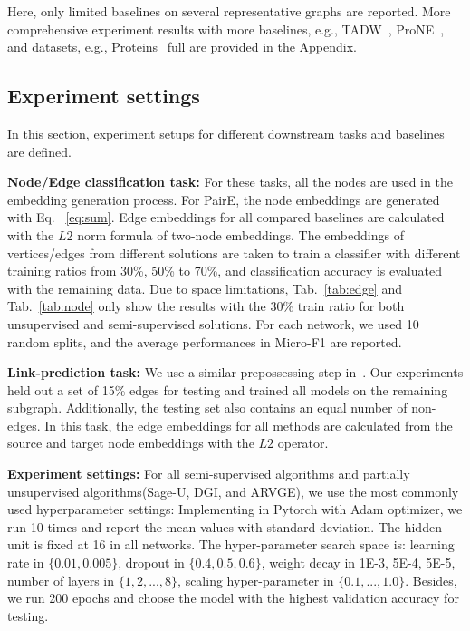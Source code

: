 \documentclass[10pt,journal,compsoc]{IEEEtran}
\begin{document}
Here, only limited baselines on several representative graphs are reported. More comprehensive experiment results with more baselines, e.g., TADW~\cite{yang2015TADM}, ProNE~\cite{Zhang19_prone}, and datasets, e.g., Proteins\_full are provided in the Appendix. 
 
\subsection{Experiment settings}

In this section, experiment setups for different downstream tasks and baselines are defined. 

\noindent\textbf{Node/Edge classification task:} For these tasks, all the nodes are used in the embedding generation process. For PairE, the node embeddings are generated with Eq. ~\ref{eq:sum}. Edge embeddings for all compared baselines are calculated with the $L2$ norm formula of two-node embeddings. The embeddings of vertices/edges from different solutions are taken to train a classifier with different training ratios from 30\%, 50\% to 70\%, and classification accuracy is evaluated with the remaining data. Due to space limitations, Tab.~\ref{tab:edge} and Tab.~\ref{tab:node} only show the results with the 30\% train ratio for both unsupervised and semi-supervised solutions. For each network, we used 10 random splits, and the average performances in Micro-F1 are reported. 


\noindent\textbf{Link-prediction task:} We use a similar prepossessing step in~\cite{Grover16}. Our experiments held out a set of 15\% edges for testing and trained all models on the remaining subgraph. Additionally, the testing set also contains an equal number of non-edges. In this task, the edge embeddings for all methods are calculated from the source and target node embeddings with the $L2$ operator. 

\noindent\textbf{Experiment settings:} For all semi-supervised algorithms and partially unsupervised algorithms(Sage-U, DGI, and ARVGE), we use the most commonly used hyperparameter settings: Implementing in Pytorch with Adam optimizer, we run 10 times and report the mean values with standard deviation. The hidden unit is fixed at 16 in all networks. The hyper-parameter search space is: learning rate in $\{0.01,0.005\}$, dropout in $\{0.4, 0.5, 0.6\}$, weight decay in {1E-3, 5E-4, 5E-5}, number of layers in $\{1, 2,..., 8\}$, scaling hyper-parameter in $\{0.1,...,1.0\}$. Besides, we run 200 epochs and choose the model with the highest validation accuracy for testing.
\end{document}
